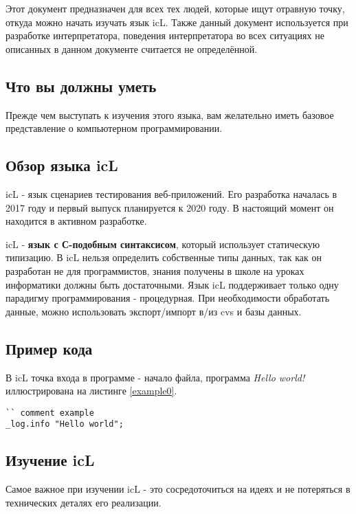 \documentclass[a4paper, 14pt]{extarticle}
\begin{document}
	Этот документ предназначен для всех тех людей, которые ищут отравную точку, откуда можно начать изучать язык icL. Также данный документ используется при разработке интерпретатора, поведения интерпретатора во всех ситуациях не описанных в данном документе считается не определённой.
	
\subsection{Что вы должны уметь}
	
Прежде чем выступать к изучения этого языка, вам желательно иметь базовое представление о компьютерном программировании.
	
\subsection{Обзор языка icL}
	
	icL - язык сценариев тестирования веб-приложений. Его разработка началась в 2017 году и первый выпуск планируется к 2020 году. В настоящий момент он находится в активном разработке.
	
	icL - \textbf{язык с С-подобным синтаксисом}, который использует статическую типизацию. В icL нельзя определить собственные типы данных, так как он разработан не для программистов, знания получены в школе на уроках информатики должны быть достаточными. Язык icL поддерживает только одну парадигму программирования - процедурная. При необходимости обработать данные, можно использовать экспорт/импорт в/из cvs и базы данных.
	
\subsection{Пример кода}

	В icL точка входа в программе - начало файла, программа \textit{Hello world!} иллюстрирована на листинге \ref{example0}.
	
\begin{lstlisting}[caption=Пример, label=example0]
`` comment example
_log.info "Hello world";
\end{lstlisting}
  
\subsection{Изучение icL}
	
	Самое важное при изучении icL - это сосредоточиться на идеях и не потеряться в технических деталях его реализации.
	
\end{document}
